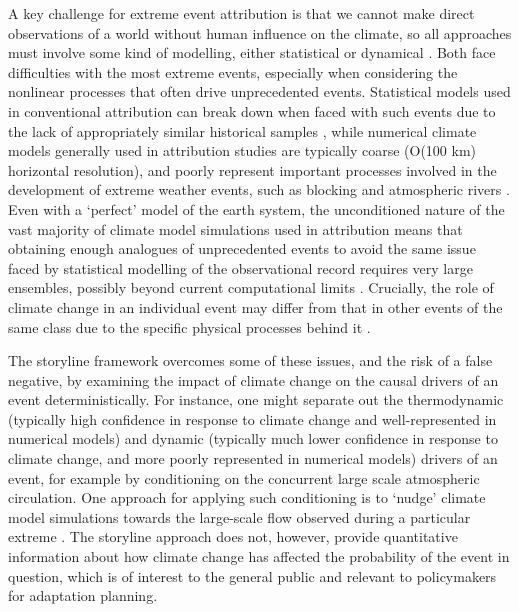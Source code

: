   A key challenge for extreme event attribution is that we cannot make direct observations of a world without human influence on the climate, so all approaches must involve some kind of modelling, either statistical \cite{van_oldenborgh_how_2007} or dynamical \cite{pall_anthropogenic_2011}. Both face difficulties with the most extreme events, especially when considering the nonlinear processes that often drive unprecedented events. Statistical models used in conventional attribution can break down when faced with such events due to the lack of appropriately similar historical samples \cite{gessner_very_2021}, while numerical climate models generally used in attribution studies are typically coarse (O(100 km) horizontal resolution), and poorly represent important processes involved in the development of extreme weather events, such as blocking \cite{masato_winter_2013} and atmospheric rivers \cite{payne_evaluation_2015}. Even with a `perfect' model of the earth system, the unconditioned nature of the vast majority of climate model simulations used in attribution means that obtaining enough analogues of unprecedented events \cite{fischer_increasing_2021} to avoid the same issue faced by statistical modelling of the observational record requires very large ensembles, possibly beyond current computational limits \cite{leach_generating_2022}. Crucially, the role of climate change in an individual event may differ from that in other events of the same class due to the specific physical processes behind it \cite{palmer_nonlinear_1999,palmer_simple_2018}.

  The storyline framework overcomes some of these issues, and the risk of a false negative, by examining the impact of climate change on the causal drivers of an event deterministically. For instance, one might separate out the thermodynamic (typically high confidence in response to climate change and well-represented in numerical models) and dynamic (typically much lower confidence in response to climate change, and more poorly represented in numerical models) drivers of an event, for example by conditioning on the concurrent large scale atmospheric circulation. One approach for applying such conditioning is to `nudge' climate model simulations towards the large-scale flow observed during a particular extreme \cite{van_garderen_methodology_2021,benitez_july_2022}. The storyline approach does not, however, provide quantitative information about how climate change has affected the probability of the event in question, which is of interest to the general public and relevant to policymakers for adaptation planning.


